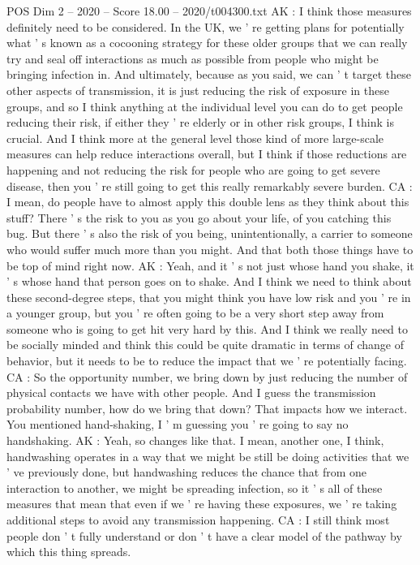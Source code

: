 \begin{textsample}{POS Dim 2 – 2020 – Score 18.00 – 2020/t004300.txt}
AK : I think those measures definitely need to be considered.
In the UK, we ' re getting plans for potentially what ' s known as a cocooning strategy for these older groups that we can really try and seal off interactions as much as possible from people who might be bringing infection in.
And ultimately, because as you said, we can ' t target these other aspects of transmission, it is just reducing the risk of exposure in these groups, and so I think anything at the individual level you can do to get people reducing their risk, if either they ' re elderly or in other risk groups, I think is crucial.
And I think more at the general level those kind of more large-scale measures can help reduce interactions overall, but I think if those reductions are happening and not reducing the risk for people who are going to get severe disease, then you ' re still going to get this really remarkably severe burden.
CA : I mean, do people have to almost apply this double lens as they think about this stuff?
There ' s the risk to you as you go about your life, of you catching this bug.
But there ' s also the risk of you being, unintentionally, a carrier to someone who would suffer much more than you might.
And that both those things have to be top of mind right now.
AK : Yeah, and it ' s not just whose hand you shake, it ' s whose hand that person goes on to shake.
And I think we need to think about these second-degree steps, that you might think you have low risk and you ' re in a younger group, but you ' re often going to be a very short step away from someone who is going to get hit very hard by this.
And I think we really need to be socially minded and think this could be quite dramatic in terms of change of behavior, but it needs to be to reduce the impact that we ' re potentially facing.
CA : So the opportunity number, we bring down by just reducing the number of physical contacts we have with other people.
And I guess the transmission probability number, how do we bring that down?
That impacts how we interact.
You mentioned hand-shaking, I ' m guessing you ' re going to say no handshaking.
AK : Yeah, so changes like that.
I mean, another one, I think, handwashing operates in a way that we might be still be doing activities that we ' ve previously done, but handwashing reduces the chance that from one interaction to another, we might be spreading infection, so it ' s all of these measures that mean that even if we ' re having these exposures, we ' re taking additional steps to avoid any transmission happening.
CA : I still think most people don ' t fully understand or don ' t have a clear model of the pathway by which this thing spreads.

\end{textsample}
